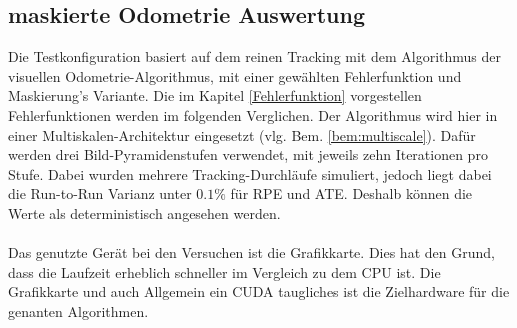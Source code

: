 \documentclass[12pt,DIV=15,BCOR=15mm,twoside,headsepline,abstract=true,listof=totoc,bibliography=totoc]{scrreprt}
\theoremstyle{remark}    %
\begin{document}
    \subsection{maskierte Odometrie Auswertung} \label{sec:aus_vis_odom}
    Die Testkonfiguration basiert auf dem reinen Tracking mit dem Algorithmus der visuellen Odometrie-Algorithmus, mit einer gewählten Fehlerfunktion und Maskierung's
    Variante. Die im Kapitel \ref{Fehlerfunktion} vorgestellen Fehlerfunktionen werden im folgenden Verglichen.
    Der Algorithmus wird hier in einer Multiskalen-Architektur eingesetzt (vlg. Bem. \ref{bem:multiscale}). Dafür werden drei Bild-Pyramidenstufen verwendet, 
    mit jeweils zehn Iterationen pro Stufe. Dabei wurden mehrere Tracking-Durchläufe simuliert, jedoch liegt dabei die Run-to-Run Varianz unter $0.1 \%$ 
    für \ac{RPE} und \ac{ATE}. Deshalb können die Werte als deterministisch angesehen werden.\\\\
    Das genutzte Gerät bei den Versuchen ist die Grafikkarte. Dies hat den Grund, dass die Laufzeit erheblich schneller im Vergleich zu dem CPU ist. 
    Die Grafikkarte und auch Allgemein ein CUDA taugliches ist die Zielhardware für die genanten Algorithmen.\\\\
\end{document}
